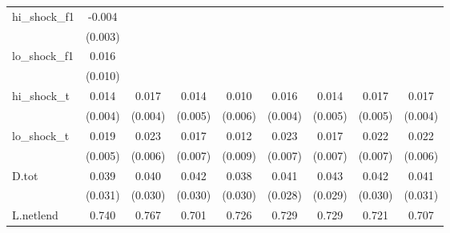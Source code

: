 {\begin{tabular}{l*{8}{c}}
\addlinespace
hi\_shock\_f1 &      -0.004         &                     &                     &                     &                     &                     &                     &                     \\
            &     (0.003)         &                     &                     &                     &                     &                     &                     &                     \\
\addlinespace
lo\_shock\_f1 &       0.016         &                     &                     &                     &                     &                     &                     &                     \\
            &     (0.010)         &                     &                     &                     &                     &                     &                     &                     \\
\addlinespace
hi\_shock\_t  &       0.014\sym{***}&       0.017\sym{***}&       0.014\sym{**} &       0.010         &       0.016\sym{***}&       0.014\sym{**} &       0.017\sym{***}&       0.017\sym{***}\\
            &     (0.004)         &     (0.004)         &     (0.005)         &     (0.006)         &     (0.004)         &     (0.005)         &     (0.005)         &     (0.004)         \\
\addlinespace
lo\_shock\_t  &       0.019\sym{***}&       0.023\sym{***}&       0.017\sym{**} &       0.012         &       0.023\sym{***}&       0.017\sym{**} &       0.022\sym{***}&       0.022\sym{***}\\
            &     (0.005)         &     (0.006)         &     (0.007)         &     (0.009)         &     (0.007)         &     (0.007)         &     (0.007)         &     (0.006)         \\
\addlinespace
D.tot       &       0.039         &       0.040         &       0.042         &       0.038         &       0.041         &       0.043         &       0.042         &       0.041         \\
            &     (0.031)         &     (0.030)         &     (0.030)         &     (0.030)         &     (0.028)         &     (0.029)         &     (0.030)         &     (0.031)         \\
\addlinespace
L.netlend   &       0.740\sym{***}&       0.767\sym{***}&       0.701\sym{***}&       0.726\sym{***}&       0.729\sym{***}&       0.729\sym{***}&       0.721\sym{***}&       0.707\sym{***}\\

\end{tabular}}
